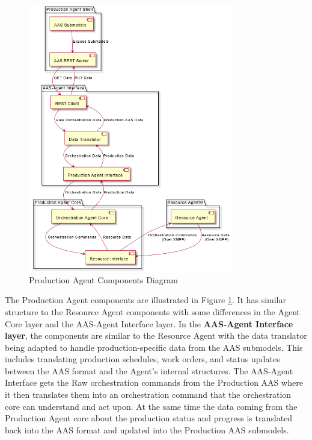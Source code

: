 \begin{figure}[ht]
    \centering
    \includegraphics[width=0.8\textwidth]{Images/Production_Agent_Components.png}
    \caption{Production Agent Components Diagram}
    \label{fig:production_agent_components}
\end{figure}

The Production Agent components are illustrated in Figure \ref{fig:production_agent_components}.
It has similar structure to the Resource Agent components with some differences in the Agent Core layer and the AAS-Agent Interface layer.
In the \textbf{AAS-Agent Interface layer}, the components are similar to the Resource Agent with the data translator being adapted to handle production-specific data from the AAS submodels.
This includes translating production schedules, work orders, and status updates between the AAS format and the Agent's internal structures.
The AAS-Agent Interface gets the Raw orchestration commands from the Production AAS where it then translates them into an orchestration command
that the orchestration core can understand and act upon.
At the same time the data coming from the Production Agent core about the production status and progress is translated back into the AAS format and updated into the Production AAS submodels.


